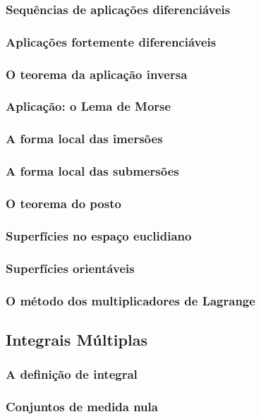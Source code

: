 \documentclass{article}
\theoremstyle{theorem}
\theoremstyle{lemma}
\theoremstyle{definition}
\theoremstyle{remark}
\begin{document}
   \subsubsection{Sequências de aplicações diferenciáveis}
   \subsubsection{Aplicações fortemente diferenciáveis}
   \subsubsection{O teorema da aplicação inversa}
   \subsubsection{Aplicação: o Lema de Morse}
   \subsubsection{ A forma local das imersões}
   \subsubsection{ A forma local das submersões}
   \subsubsection{ O teorema do posto}
   \subsubsection{ Superfícies no espaço euclidiano}
   \subsubsection{ Superfícies orientáveis}
   \subsubsection{ O método dos multiplicadores de Lagrange}

\subsection{ Integrais Múltiplas}
   \subsubsection{A definição de integral}
   \subsubsection{Conjuntos de medida nula}
\end{document}

